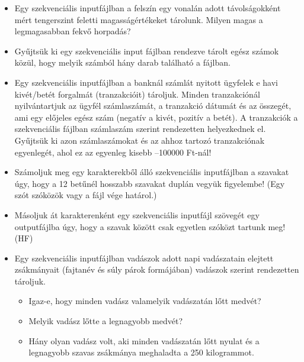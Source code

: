 \documentclass[12pt,a4paper]{article}
\begin{document}
\begin{itemize}
\item Egy szekvenciális inputfájlban a felszín egy vonalán adott távolságokként mért
tengerszint feletti magasságértékeket tárolunk. Milyen magas a legmagasabban fekvő
horpadás?
\item Gyűjtsük ki egy szekvenciális input fájlban rendezve tárolt egész számok közül, hogy melyik számból hány darab található a fájlban.
\item Egy szekvenciális inputfájlban a banknál számlát nyitott ügyfelek e havi kivét/betét
forgalmát (tranzakcióit) tároljuk. Minden tranzakciónál nyilvántartjuk az ügyfél
számlaszámát, a tranzakció dátumát és az összegét, ami egy előjeles egész szám
(negatív a kivét, pozitív a betét). A tranzakciók a szekvenciális fájlban számlaszám
szerint rendezetten helyezkednek el. Gyűjtsük ki azon számlaszámokat és az ahhoz
tartozó tranzakciónak egyenlegét, ahol ez az egyenleg kisebb –100000 Ft-nál!
\item Számoljuk meg egy karakterekből álló szekvenciális inputfájlban a szavakat úgy, hogy
a 12 betűnél hosszabb szavakat duplán vegyük figyelembe! (Egy szót szóközök vagy a
fájl vége határol.)
\item Másoljuk át karakterenként egy szekvenciális inputfájl szövegét egy outputfájlba úgy,
hogy a szavak között csak egyetlen szóközt tartunk meg! (HF)
\item Egy szekvenciális inputfájlban vadászok adott napi vadászatain elejtett zsákmányait
(fajtanév és súly párok formájában) vadászok szerint rendezetten tároljuk.
\begin{itemize}
\item Igaz-e, hogy minden vadász valamelyik vadászatán lőtt medvét?
\item Melyik vadász lőtte a legnagyobb medvét?
\item Hány olyan vadász volt, aki minden vadászatán lőtt nyulat és a legnagyobb szavas
zsákmánya meghaladta a 250 kilogrammot.
\end{itemize}
\end{itemize}
\end{document}

